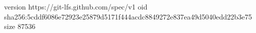 version https://git-lfs.github.com/spec/v1
oid sha256:5cddf6086e72923e25879d5171f444acdc8849272e837ea49d5040edd22b3e75
size 87536
